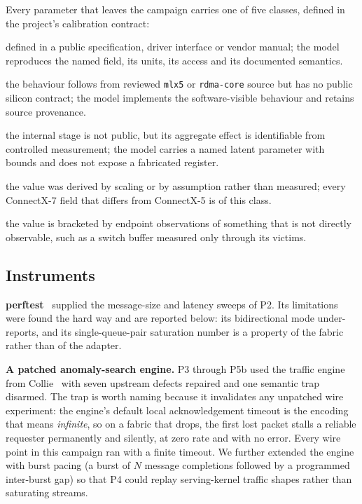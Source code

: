 Every parameter that leaves the campaign carries one of five classes, defined
in the project's calibration contract:

\begin{description}\itemsep2pt
  \item[\evdoc{}] defined in a public specification, driver interface or vendor
    manual; the model reproduces the named field, its units, its access and its
    documented semantics.
  \item[\evdrv{}] the behaviour follows from reviewed \texttt{mlx5} or
    \texttt{rdma-core} source but has no public silicon contract; the model
    implements the software-visible behaviour and retains source provenance.
  \item[\evcal{}] the internal stage is not public, but its aggregate effect is
    identifiable from controlled measurement; the model carries a named latent
    parameter with bounds and does not expose a fabricated register.
  \item[\evdecl{}] the value was derived by scaling or by assumption rather than
    measured; every ConnectX-7 field that differs from ConnectX-5 is of this
    class.
  \item[\evinf{}] the value is bracketed by endpoint observations of something
    that is not directly observable, such as a switch buffer measured only
    through its victims.
\end{description}

\subsection{Instruments}

\textbf{perftest}~\cite{perftest} supplied the message-size and latency
sweeps of P2. Its
limitations were found the hard way and are reported below: its bidirectional
mode under-reports, and its single-queue-pair saturation number is a property
of the fabric rather than of the adapter.

\textbf{A patched anomaly-search engine.} P3 through P5b used the traffic
engine from Collie~\cite{collie2022} with seven upstream defects repaired and
one semantic trap disarmed. The trap is worth naming because it invalidates any
unpatched wire experiment: the engine's default local acknowledgement timeout
is the encoding that means \emph{infinite}, so on a fabric that drops, the first
lost packet stalls a reliable requester permanently and silently, at zero rate
and with no error. Every wire point in this campaign ran with a finite timeout.
We further extended the engine with burst pacing (a burst of $N$ message
completions followed by a programmed inter-burst gap) so that P4 could replay
serving-kernel traffic shapes rather than saturating streams.

